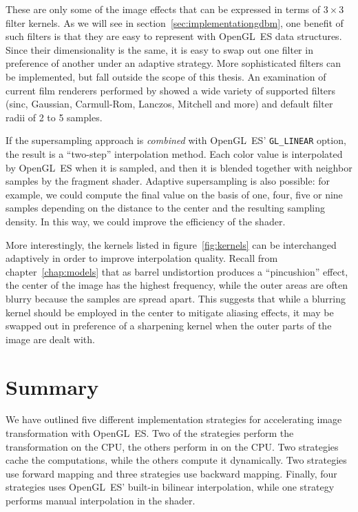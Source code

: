 \documentclass[english,12pt]{ifimaster}
\begin{document}

These are only some of the image effects that can be expressed in
terms of $3 \times 3$ filter kernels. As we will see in
section~\ref{sec:implementationgdbm}, one benefit of such filters is
that they are easy to represent with OpenGL~ES data structures. Since
their dimensionality is the same, it is easy to swap out one filter in
preference of another under an adaptive strategy. More sophisticated
filters can be implemented, but fall outside the scope of this thesis.
An examination of current film renderers performed by
\citet{wexler05:-rasterization} showed a wide variety of supported
filters (sinc, Gaussian, Carmull-Rom, Lanczos, Mitchell and more) and
default filter radii of 2 to 5 samples.

If the supersampling approach is \emph{combined} with OpenGL~ES'
\lstinline|GL_LINEAR| option, the result is a ``two-step''
interpolation method. Each color value is interpolated by OpenGL~ES
when it is sampled, and then it is blended together with neighbor
samples by the fragment shader. Adaptive supersampling is also
possible: for example, we could compute the final value on the basis
of one, four, five or nine samples depending on the distance to the
center and the resulting sampling density. In this way, we could
improve the efficiency of the shader.

More interestingly, the kernels listed in figure~\ref{fig:kernels} can
be interchanged adaptively in order to improve interpolation quality.
Recall from chapter~\ref{chap:models} that as barrel undistortion
produces a ``pincushion'' effect, the center of the image has the
highest frequency, while the outer areas are often blurry because the
samples are spread apart. This suggests that while a blurring kernel
should be employed in the center to mitigate aliasing effects, it may
be swapped out in preference of a sharpening kernel when the outer
parts of the image are dealt with.

\section*{Summary}

We have outlined five different implementation strategies for
accelerating image transformation with OpenGL~ES. Two of the
strategies perform the transformation on the CPU, the others perform
in on the CPU. Two strategies cache the computations, while the others
compute it dynamically. Two strategies use forward mapping and three
strategies use backward mapping. Finally, four strategies uses
OpenGL~ES' built-in bilinear interpolation, while one strategy
performs manual interpolation in the shader.
\end{document}
